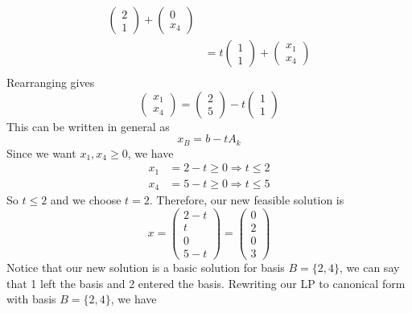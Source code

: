 \begin{definition}
\begin{align*}
\begin{pmatrix}
                                                                        2 \\ 1
                                                                    \end{pmatrix} + \begin{pmatrix}
                                                                                        0 \\ x_4
                                                                                    \end{pmatrix}             \\
                            & = t \begin{pmatrix}
                                      1 \\ 1
                                  \end{pmatrix} + \begin{pmatrix}
                                                      x_1 \\ x_4
                                                  \end{pmatrix}                                               \\
        \end{align*}
        Rearranging gives $$\begin{pmatrix}
                x_1 \\ x_4
            \end{pmatrix} = \begin{pmatrix}
                2 \\ 5
            \end{pmatrix} - t \begin{pmatrix}
                1 \\ 1
            \end{pmatrix}$$
        This can be written in general as $$x_B = b - tA_k$$
        Since we want $x_1,x_4 \geq 0$, we have
        \begin{align*}
            x_1 & = 2 - t \geq 0 \Rightarrow t \leq 2 \\
            x_4 & = 5 - t \geq 0 \Rightarrow t \leq 5
        \end{align*}
        So $t \leq 2$ and we choose $t = 2$. Therefore, our new feasible solution is $$x = \begin{pmatrix}
                2 - t \\ t \\ 0 \\ 5 - t
            \end{pmatrix} = \begin{pmatrix}
                0 \\ 2 \\ 0 \\ 3
            \end{pmatrix}$$
        Notice that our new solution is a basic solution for basis $B = \{2,4\}$, we can say that 1 left the basis and 2 entered the basis. Rewriting our LP to canonical form with basis $B = \{2,4\}$, we have
    

\end{definition}
